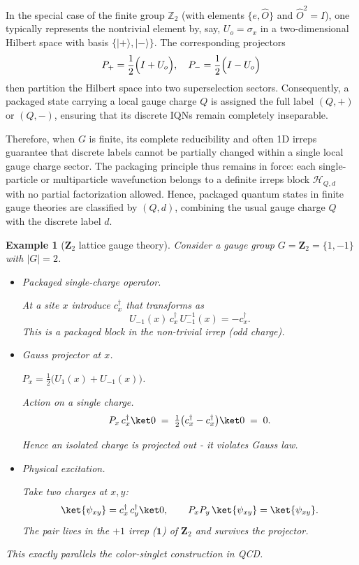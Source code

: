 \documentclass[12pt,a4paper]{article}
\newtheorem{example}{Example}
\begin{document}
In the special case of the finite group $\mathbb{Z}_2$ (with elements $\{e, \hat{O}\}$ and $\hat{O}^2 = I$),\cite{Wegner1971} one typically represents the nontrivial element by, say, $U_o = \sigma_x$ in a two-dimensional Hilbert space with basis $\{|+\rangle, |-\rangle\}$. The corresponding projectors
\[
P_{+} = \frac{1}{2}\Bigl(I + U_o\Bigr), \quad P_{-} = \frac{1}{2}\Bigl(I - U_o\Bigr)
\]
then partition the Hilbert space into two superselection sectors. Consequently, a packaged state carrying a local gauge charge $Q$ is assigned the full label $(Q,+)$ or $(Q,-)$, ensuring that its discrete IQNs remain completely inseparable.


Therefore, when $G$ is finite, its complete reducibility and often 1D irreps guarantee that discrete labels cannot be partially changed within a single local gauge charge sector.
The packaging principle thus remains in force:
each single-particle or multiparticle wavefunction belongs to a definite irreps block $\mathcal{H}_{Q,d}$ with no partial factorization allowed.
Hence, packaged quantum states in finite gauge theories are classified by $(Q,d)$, combining the usual gauge charge $Q$ with the discrete label $d$.


\begin{example}[$\mathbf Z_2$ lattice gauge theory]
	Consider a gauge group $G=\mathbf Z_2=\{1,-1\}$ with $|G|=2$.
	
	\begin{itemize}
		\item Packaged single-charge operator.
		
		At a site $x$ introduce $c^\dagger_x$ that transforms as
		$$
		U_{-1}(x)\,c^\dagger_x\,U_{-1}^{-1}(x)=-c^\dagger_x.
		$$
		This is a packaged block in the non-trivial irrep (odd charge).
		
		\item Gauss projector at $x$.
		
		$P_x=\tfrac12\bigl(U_{1}(x)+U_{-1}(x)\bigr)$.
		
		Action on a single charge.		
		$$
		P_x\,c^\dagger_x\ket0
		\;=\;
		\tfrac12\bigl(c^\dagger_x-c^\dagger_x\bigr)\ket0
		\;=\;0 .
		$$
		
		Hence an isolated charge is projected out - it violates Gauss law.
		
		\item Physical excitation.
		
		Take two charges at $x,y$:		
		$$
		\ket{\psi_{xy}}
		=c^\dagger_x\,c^\dagger_y\ket0,
		\qquad
		P_xP_y\,\ket{\psi_{xy}}=\ket{\psi_{xy}} .
		$$
		The pair lives in the $+1$ irrep ($\mathbf 1$) of $\mathbf Z_2$ and survives the projector.
	\end{itemize}
	
	This exactly parallels the color-singlet construction in QCD.
\end{example}
\end{document}
